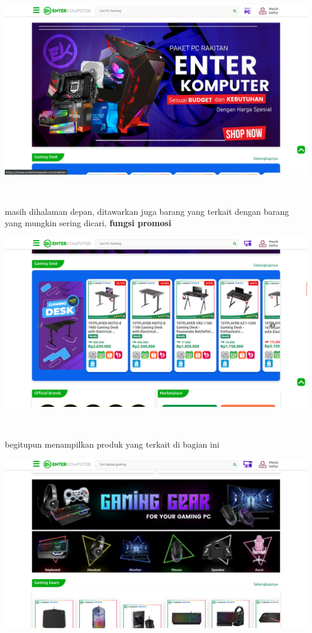 \documentclass{article}
\begin{document}
\begin{minipage}{0.65\textwidth}
    \includegraphics[width=\textwidth]{file-31.png}
\end{minipage}
\\
\begin{minipage}{0.30\textwidth}
    masih dihalaman depan, ditawarkan juga barang yang terkait dengan barang yang mungkin sering dicari, \textbf{fungsi promosi}
\end{minipage}
\hspace*{0.04\textwidth}
\begin{minipage}{0.65\textwidth}
    \includegraphics[width=\textwidth]{file-30.png}
\end{minipage}
\\
\begin{minipage}{0.30\textwidth}
    begitupun menampilkan produk yang terkait di bagian ini
\end{minipage}
\hspace*{0.04\textwidth}
\begin{minipage}{0.65\textwidth}
    \includegraphics[width=\textwidth]{file-28.png}
\end{minipage}
\end{document}
